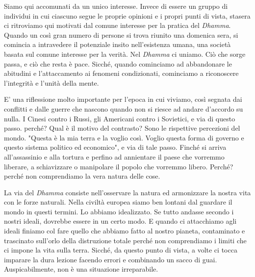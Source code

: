 
Siamo qui accomunati da un unico interesse. Invece di essere un gruppo
di individui in cui ciascuno segue le proprie opinioni e i propri punti
di vista, stasera ci ritroviamo qui motivati dal comune interesse per la
pratica del \textit{Dhamma}. Quando un così gran numero di persone si trova
riunito una domenica sera, si comincia a intravedere il potenziale
insito nell'esistenza umana, una società basata sul comune interesse per
la verità. Nel \textit{Dhamma} ci uniamo. Ciò che sorge passa, e ciò che resta è
pace. Sicché, quando cominciamo ad abbandonare le abitudini e
l'attaccamento ai fenomeni condizionati, cominciamo a riconoscere
l'integrità e l'unità della mente.

E' una riflessione molto importante per l'epoca in cui viviamo, così
segnata dai conflitti e dalle guerre che nascono quando non si riesce ad
andare d'accordo su nulla. I Cinesi contro i Russi, gli Americani contro
i Sovietici, e via di questo passo. perché? Qual è il motivo del
contrasto? Sono le rispettive percezioni del mondo. "Questa è la mia
terra e la voglio così. Voglio questa forma di governo e questo sistema
politico ed economico", e via di tale passo. Finché si arriva
all'assassinio e alla tortura e perfino ad annientare il paese che
vorremmo liberare, a schiavizzare o manipolare il popolo che vorremmo
libero. Perché? perché non comprendiamo la vera natura delle cose.

La via del \textit{Dhamma} consiste nell'osservare la natura ed armonizzare la
nostra vita con le forze naturali. Nella civiltà europea siamo ben
lontani dal guardare il mondo in questi termini. Lo abbiamo idealizzato.
Se tutto andasse secondo i nostri ideali, dovrebbe essere in un certo
modo. E quando ci attacchiamo agli ideali finiamo col fare quello che
abbiamo fatto al nostro pianeta, contaminato e trascinato sull'orlo
della distruzione totale perché non comprendiamo i limiti che ci impone
la vita sulla terra. Sicché, da questo punto di vista, a volte ci tocca
imparare la dura lezione facendo errori e combinando un sacco di guai.
Auspicabilmente, non è una situazione irreparabile.

